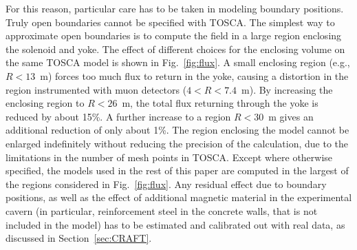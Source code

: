 For this reason,
particular care has to be taken in modeling boundary positions. Truly open
boundaries cannot be specified with TOSCA. The simplest way to
approximate open boundaries is to compute the field in a large
region enclosing the solenoid and yoke. The effect of different
choices for the enclosing volume on the same TOSCA model is shown in
Fig.~\ref{fig:flux}. A small enclosing
region (e.g., $R < 13$~m) forces too much flux to return in the yoke,
causing a distortion in the region instrumented with muon detectors
($4 < R < 7.4$~m).
By increasing the enclosing region to $R<26$~m, the total flux
returning through the
yoke is reduced by about 15\%. A further increase to a region $R<30$~m
gives an additional reduction of only about 1\%.
The region enclosing the model cannot be enlarged indefinitely without
reducing the precision of the calculation, due to the
limitations in the number of mesh points in TOSCA.
Except where otherwise specified, the models used in the
rest of this paper are computed in the largest of the regions considered in
Fig.~\ref{fig:flux}. Any residual effect due to boundary positions,
as well as the effect of additional magnetic material in the
experimental cavern (in particular, reinforcement steel in the concrete
walls, that is not included in the model) has to be estimated and
calibrated out with real data, as discussed in Section~\ref{sec:CRAFT}.
